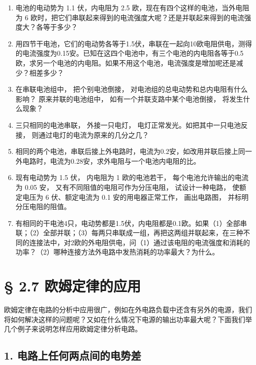 \begin{enumerate}
\def\labelenumi{\arabic{enumi}.}
\item
  电池的电动势为 1.1 伏，内电阻为 2.5
  欧，现在有四个这样的电池，当外电阻为 6
  欧时，把它们串联起来得到的电流强度大呢？还是并联起来得到的电流强度大？各等于多少？
\item
  用四节干电池，它们的电动势各等于1.5伏，串联在一起向10欧电阻供电，测得的电流强度为0.15安。已知在这四个电池中，有三个电池的内电阻各等于0.5欧，求另一个电池的内电阻。如果不用这个电池，电流强度是增加呢还是减少？相差多少？
\item
  在串联电池组中， 把个别电池倒接，
  对电池组的总电动势和总内电阻有什么影响？ 原来并联的电池组中，
  如有一个并联支路中某个电池倒接， 将发生什么现象？
\item
  三只相同的电池串联， 外接一只电灯，
  电灯正常发光。如把其中一只电池反接，
  则通过电灯的电流为原来的几分之几？
\item
  相同的两个电池，串联后接上外电路时，电流为0.2安，如改用并联后接上同一外电路时，电流为0.28安，求外电阻与一个电池内电阻的比。
\item
  现有电动势为 1.5 伏， 内电阻为 1 欧的电池若干，
  每个电池允许输出的电流为 0.05 安， 又有不同阻值的电阻可作为分压电阻，
  试设计一种电路， 使额定电压为 6 伏、额定电流为 0.1
  安的用电器正常工作， 画出电路图， 并标明分压电阻的阻值。
\item
  有相同的干电池4只，电动势都是1.5伏，内电阻都是0.1欧。如果（1）全部串联；（2）全部并联；（3）每两只串联成一组，再把这两组并联起来，在三种不同的连接法中，对2欧的外电阻供电，问（1）通过该电阻的电流强度和消耗的功率？（2）哪种连接方法外电路中发热消耗的功率最大？为什么。
\end{enumerate}

\section{§ 2.7
欧姆定律的应用}\label{ux6b27ux59c6ux5b9aux5f8bux7684ux5e94ux7528}

欧姆定律在电路的分析中应用很广，例如在外电路负载中还含有另外的电源，我们将如何解决这样的问题呢？又如在什么情况下电源的输出功率最大呢？下面我们举几个例子来说明怎样应用欧姆定律分析电路。

\subsection{1.
电路上任何两点间的电势差}\label{ux7535ux8defux4e0aux4efbux4f55ux4e24ux70b9ux95f4ux7684ux7535ux52bfux5dee}

